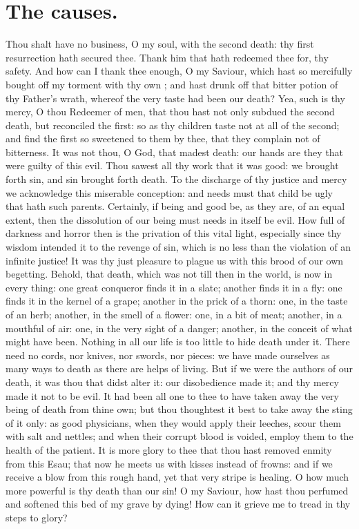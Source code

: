 \section{The causes.}
Thou shalt have no business, O my soul, with the second death: thy first resurrection hath secured thee. Thank him that hath redeemed thee for, thy safety. And how can I thank thee enough, O my Saviour, which hast so mercifully bought off my torment with thy own ; and hast drunk off that bitter potion of thy Father's wrath, whereof the very taste had been our death? Yea, such is thy mercy, O thou Redeemer of men, that thou hast not only subdued the second death, but reconciled the first: so as thy children taste not at all of the second; and find the first so sweetened to them by thee, that they complain not of bitterness. It was not thou, O God, that madest death: our hands are they that were guilty of this evil. Thou sawest all thy work that it was good: we brought forth sin, and sin brought forth death. To the discharge of thy justice and mercy we acknowledge this miserable conception: and needs must that child be ugly that hath such parents. Certainly, if being and good be, as they are, of an equal extent, then the dissolution of our being must needs in itself be evil. How full of darkness and horror then is the privation of this vital light, especially since thy wisdom intended it to the revenge of sin, which is no less than the violation of an infinite justice! It was thy just pleasure to plague us with this brood of our own begetting. Behold, that death, which was not till then in the world, is now in every thing: one great conqueror finds it in a slate; another finds it in a fly: one finds it in the kernel of a grape; another in the prick of a thorn: one, in the taste of an herb; another, in the smell of a flower: one, in a bit of meat; another, in a mouthful of air: one, in the very sight of a danger; another, in the conceit of what might have been. Nothing in all our life is too little to hide death under it. There need no cords, nor knives, nor swords, nor pieces: we have made ourselves as many ways to death as there are helps of living. But if we were the authors of our death, it was thou that didst alter it: our disobedience made it; and thy mercy made it not to be evil. It had been all one to thee to have taken away the very being of death from thine own; but thou thoughtest it best to take away the sting of it only: as good physicians, when they would apply their leeches, scour them with salt and nettles; and when their corrupt blood is voided, employ them to the health of the patient. It is more glory to thee that thou hast removed enmity from this Esau; that now he meets us with kisses instead of frowns: and if we receive a blow from this rough hand, yet that very stripe is healing. O how much more powerful is thy death than our sin! O my Saviour, how hast thou perfumed and softened this bed of my grave by dying! How can it grieve me to tread in thy steps to glory? 

